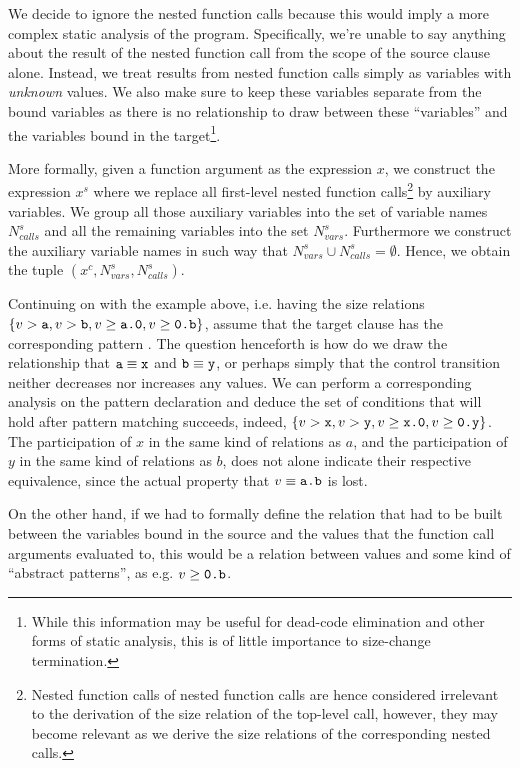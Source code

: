 We decide to ignore the nested function calls because this would imply a more
complex static analysis of the program. Specifically, we're unable to say
anything about the result of the nested function call from the scope of the
source clause alone. Instead, we treat results from nested function calls
simply as variables with \emph{unknown} values. We also make sure to keep these
variables separate from the bound variables as there is no relationship to draw
between these ``variables'' and the variables bound in the
target\footnote{While this information may be useful for dead-code elimination
and other forms of static analysis, this is of little importance to size-change
termination.}.

More formally, given a function argument as the expression $x$, we construct
the expression $x^s$ where we replace all first-level nested function
calls\footnote{Nested function calls of nested function calls are hence
considered irrelevant to the derivation of the size relation of the top-level
call, however, they may become relevant as we derive the size relations of the
corresponding nested calls.} by auxiliary variables.  We group all those
auxiliary variables into the set of variable names $N_{calls}^s$ and all the
remaining variables into the set $N_{vars}^s$.  Furthermore we construct the
auxiliary variable names in such way that $N_{vars}^s\cup
N_{calls}^s=\emptyset$.  Hence, we obtain the tuple
$(x^c,N_{vars}^s,N_{calls}^s)$.

Continuing on with the example above, i.e. having the size relations
$\{v>\text{{\ttfamily a}}, v> \text{{\ttfamily b}}, v\geq \text{{\ttfamily a.0}}, v\geq \text{{\ttfamily0.b}}\}$, assume
that the target clause has the corresponding pattern . The question
henceforth is how do we draw the relationship that $\text{{\ttfamily a}}\equiv\text{{\ttfamily x}}$
and $\text{{\ttfamily b}}\equiv\text{{\ttfamily y}}$, or perhaps simply that the control transition
neither decreases nor increases any values. We can perform a corresponding
analysis on the pattern declaration and deduce the set of conditions that will
hold after pattern matching succeeds, indeed, $\{v>\text{{\ttfamily x}}, v> \text{{\ttfamily y}},
v\geq \text{{\ttfamily x.0}}, v\geq \text{{\ttfamily0.y}}\}$. The participation of $x$ in the same
kind of relations as $a$, and the participation of $y$ in the same kind of
relations as $b$, does not alone indicate their respective equivalence, since
the actual property that $v\equiv\text{{\ttfamily a.b}}$ is lost.

On the other hand, if we had to formally define the relation that had to be
built between the variables bound in the source and the values that the
function call arguments evaluated to, this would be a relation between values
and some kind of ``abstract patterns'', as e.g. $v\geq\text{{\ttfamily0.b}}$.

